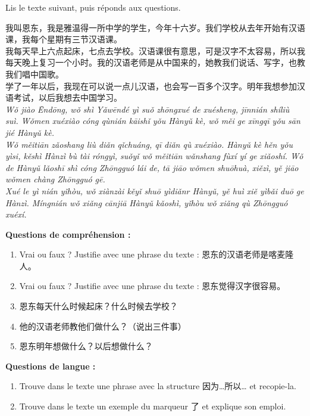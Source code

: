 \documentclass[11pt]{article}
\begin{document}
\begin{exercice}
Lis le texte suivant, puis réponds aux questions.

\begin{textebox}
我叫恩东，我是雅温得一所中学的学生，今年十六岁。我们学校从去年开始有汉语课，我每个星期有三节汉语课。\\
我每天早上六点起床，七点去学校。汉语课很有意思，可是汉字不太容易，所以我每天晚上复习一个小时。我的汉语老师是从中国来的，她教我们说话、写字，也教我们唱中国歌。\\
学了一年以后，我现在可以说一点儿汉语，也会写一百多个汉字。明年我想参加汉语考试，以后我想去中国学习。\\
\emph{Wǒ jiào Ēndōng, wǒ shì Yǎwēndé yì suǒ zhōngxué de xuésheng, jīnnián shíliù suì. Wǒmen xuéxiào cóng qùnián kāishǐ yǒu Hànyǔ kè, wǒ měi ge xīngqī yǒu sān jié Hànyǔ kè.}\\
\emph{Wǒ měitiān zǎoshang liù diǎn qǐchuáng, qī diǎn qù xuéxiào. Hànyǔ kè hěn yǒu yìsi, kěshì Hànzì bù tài róngyì, suǒyǐ wǒ měitiān wǎnshang fùxí yí ge xiǎoshí. Wǒ de Hànyǔ lǎoshī shì cóng Zhōngguó lái de, tā jiāo wǒmen shuōhuà, xiězì, yě jiāo wǒmen chàng Zhōngguó gē.}\\
\emph{Xué le yì nián yǐhòu, wǒ xiànzài kěyǐ shuō yìdiǎnr Hànyǔ, yě huì xiě yìbǎi duō ge Hànzì. Míngnián wǒ xiǎng cānjiā Hànyǔ kǎoshì, yǐhòu wǒ xiǎng qù Zhōngguó xuéxí.}
\end{textebox}

\textbf{Questions de compréhension :}
\begin{enumerate}
\item Vrai ou faux ? Justifie avec une phrase du texte : 恩东的汉语老师是喀麦隆人。
\item Vrai ou faux ? Justifie avec une phrase du texte : 恩东觉得汉字很容易。
\item 恩东每天什么时候起床？什么时候去学校？
\item 他的汉语老师教他们做什么？（说出三件事）
\item 恩东明年想做什么？以后想做什么？
\end{enumerate}
\textbf{Questions de langue :}
\begin{enumerate}
\item[6.] Trouve dans le texte une phrase avec la structure 因为…所以… et recopie-la.
\item[7.] Trouve dans le texte un exemple du marqueur 了 et explique son emploi.
\end{enumerate}
\end{exercice}
\end{document}
